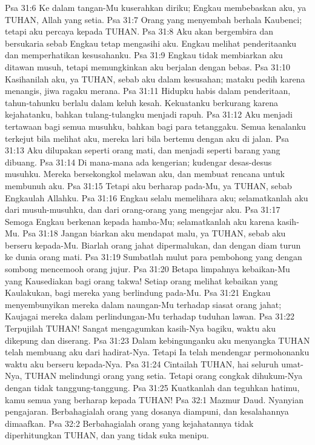 Psa 31:6  Ke dalam tangan-Mu kuserahkan diriku; Engkau membebaskan aku, ya TUHAN, Allah yang setia.
Psa 31:7  Orang yang menyembah berhala Kaubenci; tetapi aku percaya kepada TUHAN.
Psa 31:8  Aku akan bergembira dan bersukaria sebab Engkau tetap mengasihi aku. Engkau melihat penderitaanku dan memperhatikan kesusahanku.
Psa 31:9  Engkau tidak membiarkan aku ditawan musuh, tetapi memungkinkan aku berjalan dengan bebas.
Psa 31:10  Kasihanilah aku, ya TUHAN, sebab aku dalam kesusahan; mataku pedih karena menangis, jiwa ragaku merana.
Psa 31:11  Hidupku habis dalam penderitaan, tahun-tahunku berlalu dalam keluh kesah. Kekuatanku berkurang karena kejahatanku, bahkan tulang-tulangku menjadi rapuh.
Psa 31:12  Aku menjadi tertawaan bagi semua musuhku, bahkan bagi para tetanggaku. Semua kenalanku terkejut bila melihat aku, mereka lari bila bertemu dengan aku di jalan.
Psa 31:13  Aku dilupakan seperti orang mati, dan menjadi seperti barang yang dibuang.
Psa 31:14  Di mana-mana ada kengerian; kudengar desas-desus musuhku. Mereka bersekongkol melawan aku, dan membuat rencana untuk membunuh aku.
Psa 31:15  Tetapi aku berharap pada-Mu, ya TUHAN, sebab Engkaulah Allahku.
Psa 31:16  Engkau selalu memelihara aku; selamatkanlah aku dari musuh-musuhku, dan dari orang-orang yang mengejar aku.
Psa 31:17  Semoga Engkau berkenan kepada hamba-Mu; selamatkanlah aku karena kasih-Mu.
Psa 31:18  Jangan biarkan aku mendapat malu, ya TUHAN, sebab aku berseru kepada-Mu. Biarlah orang jahat dipermalukan, dan dengan diam turun ke dunia orang mati.
Psa 31:19  Sumbatlah mulut para pembohong yang dengan sombong mencemooh orang jujur.
Psa 31:20  Betapa limpahnya kebaikan-Mu yang Kausediakan bagi orang takwa! Setiap orang melihat kebaikan yang Kaulakukan, bagi mereka yang berlindung pada-Mu.
Psa 31:21  Engkau menyembunyikan mereka dalam naungan-Mu terhadap siasat orang jahat; Kaujagai mereka dalam perlindungan-Mu terhadap tuduhan lawan.
Psa 31:22  Terpujilah TUHAN! Sangat mengagumkan kasih-Nya bagiku, waktu aku dikepung dan diserang.
Psa 31:23  Dalam kebingunganku aku menyangka TUHAN telah membuang aku dari hadirat-Nya. Tetapi Ia telah mendengar permohonanku waktu aku berseru kepada-Nya.
Psa 31:24  Cintailah TUHAN, hai seluruh umat-Nya, TUHAN melindungi orang yang setia. Tetapi orang congkak dihukum-Nya dengan tidak tanggung-tanggung.
Psa 31:25  Kuatkanlah dan teguhkan hatimu, kamu semua yang berharap kepada TUHAN!
Psa 32:1  Mazmur Daud. Nyanyian pengajaran. Berbahagialah orang yang dosanya diampuni, dan kesalahannya dimaafkan.
Psa 32:2  Berbahagialah orang yang kejahatannya tidak diperhitungkan TUHAN, dan yang tidak suka menipu.
